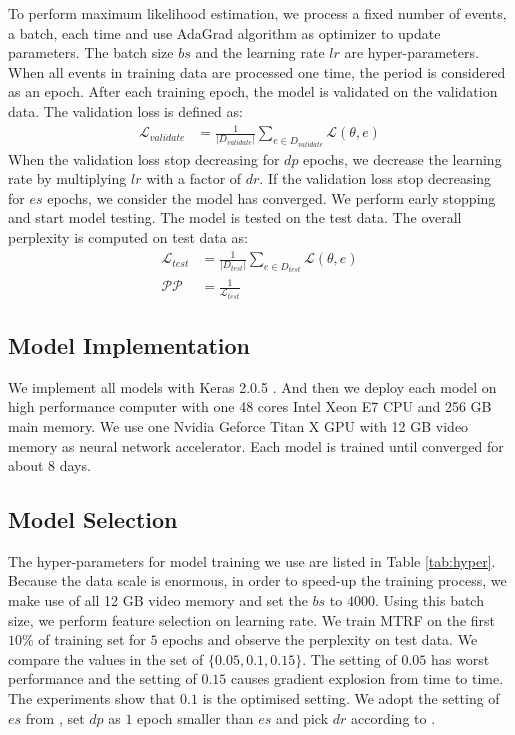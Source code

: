 \documentclass[a4paper]{article}
\begin{document}
To perform maximum likelihood estimation, we process a fixed number of events, a batch, each time and use AdaGrad algorithm \citep{duchi2011adaptive} as optimizer to update parameters. The batch size $bs$ and the learning rate $lr$ are hyper-parameters. When all events in training data are processed one time, the period is considered as an epoch. After each training epoch, the model is validated on the validation data. The validation loss is defined as: 
\begin{equation} \label{eq:validation}
\begin{aligned}
    \mathcal{L}_{validate}
        &= \frac{1}{|D_{validate}|} \sum_{e \in D_{validate}} \mathcal{L}(\theta, e) 
\end{aligned}
\end{equation}
When the validation loss stop decreasing for $dp$ epochs, we decrease the learning rate by multiplying $lr$ with a factor of $dr$. If the validation loss stop decreasing for $es$ epochs, we consider the model has converged. We perform early stopping and start model testing. The model is tested on the test data. The overall perplexity is computed on test data as:
\begin{equation} \label{eq:perplexity}
\begin{aligned}
    \mathcal{L}_{test}
        &= \frac{1}{|D_{test}|} \sum_{e \in D_{test}} \mathcal{L}(\theta, e) \\
    \mathcal{PP}
        &= \frac{1}{\mathcal{L}_{test}}
\end{aligned}
\end{equation}


\subsection{Model Implementation} \label{sec:implementation}
We implement all models with Keras 2.0.5 \citep{chollet2015keras}. And then we deploy each model on high performance computer with one 48 cores Intel Xeon E7 CPU and 256 GB main memory. We use one Nvidia Geforce Titan X GPU with 12 GB video memory as neural network accelerator. Each model is trained until converged for about 8 days.

\subsection{Model Selection} \label{sec:model-select}
The hyper-parameters for model training we use are listed in Table \ref{tab:hyper}. Because the data scale is enormous, in order to speed-up the training process, we make use of all 12 GB video memory and set the $bs$ to $4000$. Using this batch size, we perform feature selection on learning rate. We train MTRF on the first $10\%$ of training set for $5$ epochs and observe the perplexity on test data. We compare the values in the set of $\{0.05, 0.1, 0.15\}$. The setting of $0.05$ has worst performance and the setting of $0.15$ causes gradient explosion from time to time. The experiments show that $0.1$ is the optimised setting. We adopt the setting of $es$ from \citet{tilk2016event}, set $dp$ as $1$ epoch smaller than $es$ and pick $dr$ according to \citet{he2016deep}. 
\end{document}
